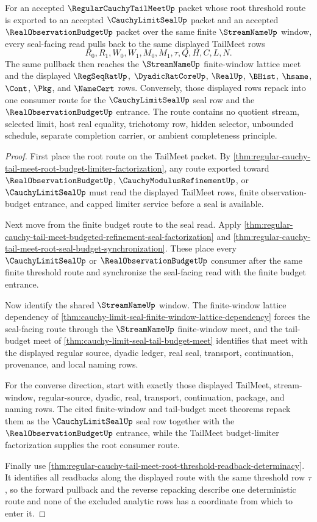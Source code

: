 \begin{theorem}
\label{thm:regular-cauchy-tail-meet-limit-seal-window-pullback}
For an accepted $\RegularCauchyTailMeetUp$ packet whose root threshold route is exported to an accepted $\CauchyLimitSealUp$ packet and an accepted $\RealObservationBudgetUp$ packet over the same finite $\StreamNameUp$ window, every seal-facing read pulls back to the same displayed TailMeet rows
$$
R_0,R_1,W_0,W_1,M_0,M_1,\tau,Q,H,C,L,N.
$$
The same pullback then reaches the $\StreamNameUp$ finite-window lattice meet and the displayed $\RegSeqRatUp$, $\DyadicRatCoreUp$, $\RealUp$, $\BHist$, $\hsame$, $\Cont$, $\Pkg$, and $\NameCert$ rows. Conversely, those displayed rows repack into one consumer route for the $\CauchyLimitSealUp$ seal row and the $\RealObservationBudgetUp$ entrance. The route contains no quotient stream, selected limit, host real equality, trichotomy row, hidden selector, unbounded schedule, separate completion carrier, or ambient completeness principle.
\end{theorem}
\begin{proof}
First place the root route on the TailMeet packet. By \autoref{thm:regular-cauchy-tail-meet-root-budget-limiter-factorization}, any route exported toward $\RealObservationBudgetUp$, $\CauchyModulusRefinementUp$, or $\CauchyLimitSealUp$ must read the displayed TailMeet rows, finite observation-budget entrance, and capped limiter service before a seal is available.

Next move from the finite budget route to the seal read. Apply \autoref{thm:regular-cauchy-tail-meet-budgeted-refinement-seal-factorization} and \autoref{thm:regular-cauchy-tail-meet-root-seal-budget-synchronization}. These place every $\CauchyLimitSealUp$ or $\RealObservationBudgetUp$ consumer after the same finite threshold route and synchronize the seal-facing read with the finite budget entrance.

Now identify the shared $\StreamNameUp$ window. The finite-window lattice dependency of \autoref{thm:cauchy-limit-seal-finite-window-lattice-dependency} forces the seal-facing route through the $\StreamNameUp$ finite-window meet, and the tail-budget meet of \autoref{thm:cauchy-limit-seal-tail-budget-meet} identifies that meet with the displayed regular source, dyadic ledger, real seal, transport, continuation, provenance, and local naming rows.

For the converse direction, start with exactly those displayed TailMeet, stream-window, regular-source, dyadic, real, transport, continuation, package, and naming rows. The cited finite-window and tail-budget meet theorems repack them as the $\CauchyLimitSealUp$ seal row together with the $\RealObservationBudgetUp$ entrance, while the TailMeet budget-limiter factorization supplies the root consumer route.

Finally use \autoref{thm:regular-cauchy-tail-meet-root-threshold-readback-determinacy}. It identifies all readbacks along the displayed route with the same threshold row $\tau$, so the forward pullback and the reverse repacking describe one deterministic route and none of the excluded analytic rows has a coordinate from which to enter it.
\end{proof}


